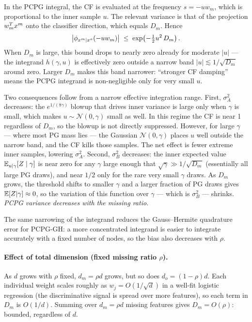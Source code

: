 In the PCPG integral, the CF is evaluated at the frequency $s = -uw_m$, which
is proportional to the inner sample $u$.
The relevant variance is that of the projection $w_m^T x^m$ onto the classifier
direction, which equals $D_m$.
Hence
\[
  \bigl|\phi_{x^m\mid x^o}(-uw_m)\bigr|
  \;\leq\;
  \exp\!\left(-\tfrac{1}{2}u^2\,D_m\right).
\]
When $D_m$ is large, this bound drops to nearly zero already for moderate $|u|$
--- the integrand $h(\gamma,u)$ is effectively zero outside a narrow band
$|u| \lesssim 1/\sqrt{D_m}$ around zero.
Larger $D_m$ makes this band narrower: ``stronger CF damping'' means the PCPG
integrand is non-negligible only for very small $u$.

Two consequences follow from a narrow effective integration range.
First, $\sigma^2_A$ decreases: the $e^{1/(8\gamma)}$ blowup that drives inner
variance is large only when $\gamma$ is small, which makes $u \sim \mathcal{N}(0,\gamma)$
small as well.
In this regime the CF is near 1 regardless of $D_m$, so the blowup is not
directly suppressed.
However, for large $\gamma$ --- where most PG mass lies --- the Gaussian
$\mathcal{N}(0,\gamma)$ places $u$ well outside the narrow band, and the CF
kills those samples.
The net effect is fewer extreme inner samples, lowering $\sigma^2_A$.
Second, $\sigma^2_B$ decreases: the inner expected value
$\mathbb{E}_{u\mid\gamma}[Z\mid\gamma]$ is near zero for any $\gamma$ large enough that
$\sqrt{\gamma} \gg 1/\sqrt{D_m}$ (essentially all large PG draws), and near
$1/2$ only for the rare very small $\gamma$ draws.
As $D_m$ grows, the threshold shifts to smaller $\gamma$ and a larger fraction of
PG draws gives $\mathbb{E}[Z|\gamma]\approx 0$, so the variation of this function over
$\gamma$ --- which is $\sigma^2_B$ --- shrinks.
\emph{PCPG variance decreases with the missing ratio.}

The same narrowing of the integrand reduces the Gauss--Hermite quadrature error
for PCPG-GH: a more concentrated integrand is easier to integrate accurately
with a fixed number of nodes, so the bias also decreases with $\rho$.

\paragraph{Effect of total dimension (fixed missing ratio $\rho$).}
As $d$ grows with $\rho$ fixed, $d_m = \rho d$ grows, but so does $d_o = (1-\rho)d$.
Each individual weight scales roughly as $w_j = O(1/\sqrt{d})$ in a well-fit
logistic regression (the discriminative signal is spread over more features), so
each term in $D_m$ is $O(1/d)$.
Summing over $d_m = \rho d$ missing features gives $D_m = O(\rho)$: bounded,
regardless of $d$.

